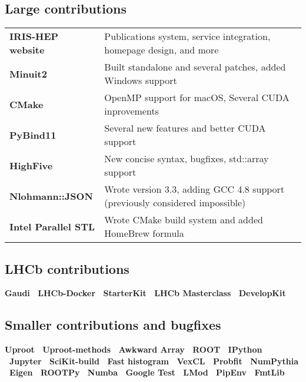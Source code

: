 \documentclass[10pt,letterpaper,english]{moderncv}
\begin{document}
\subsection{Large contributions}
\begin{tabularx}{\textwidth}{>{\bfseries}p{1.2in}X}
	IRIS-HEP website    & Publications system, service integration, homepage design, and more \\
	Minuit2        & Built standalone and several patches, added Windows support \\
	CMake          &  OpenMP support for macOS, Several CUDA inprovements  \\
	PyBind11       &  Several new features and better CUDA support      \\
	HighFive       &    New concise syntax, bugfixes, std::array support  \\
	Nlohmann::JSON & Wrote version 3.3, adding GCC 4.8 support (previously considered impossible) \\
	Intel Parallel STL & Wrote CMake build system and added HomeBrew formula \\
\end{tabularx}

\subsection{LHCb contributions}
\textbf{%
	Gaudi \bullet\ 
	LHCb-Docker \bullet\ 
	StarterKit \bullet\ 
	LHCb Masterclass \bullet\ 
	DevelopKit
}

\subsection{Smaller contributions and bugfixes}
\textbf{%
	Uproot  \bullet\ 
	Uproot-methods \bullet\ 
	Awkward Array \bullet\ 
	ROOT \bullet\ 
	IPython \bullet\ 
	Jupyter \bullet\ 
	SciKit-build \bullet\ 
	Fast histogram \bullet\  
	VexCL \bullet\ 
	Probfit  \bullet\ 
	NumPythia \bullet\ 
	Eigen  \bullet\ 
    ROOTPy \bullet\ 
    Numba \bullet\  
    Google Test  \bullet\ 
    LMod \bullet\
    PipEnv \bullet\ 
    FmtLib
}


\end{document}
